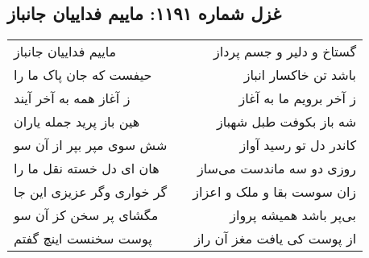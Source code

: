 \begin{center}
\section*{غزل شماره ۱۱۹۱: ماییم فداییان جانباز}
\label{sec:1191}
\begin{longtable}{l p{0.5cm} r}
ماییم فداییان جانباز
&&
گستاخ و دلیر و جسم پرداز
\\
حیفست که جان پاک ما را
&&
باشد تن خاکسار انباز
\\
ز آغاز همه به آخر آیند
&&
ز آخر برویم ما به آغاز
\\
هین باز پرید جمله یاران
&&
شه باز بکوفت طبل شهباز
\\
شش سوی مپر بپر از آن سو
&&
کاندر دل تو رسید آواز
\\
هان ای دل خسته نقل ما را
&&
روزی دو سه ماندست می‌ساز
\\
گر خواری وگر عزیزی این جا
&&
زان سوست بقا و ملک و اعزاز
\\
مگشای پر سخن کز آن سو
&&
بی‌پر باشد همیشه پرواز
\\
پوست سخنست اینچ گفتم
&&
از پوست کی یافت مغز آن راز
\\
\end{longtable}
\end{center}
